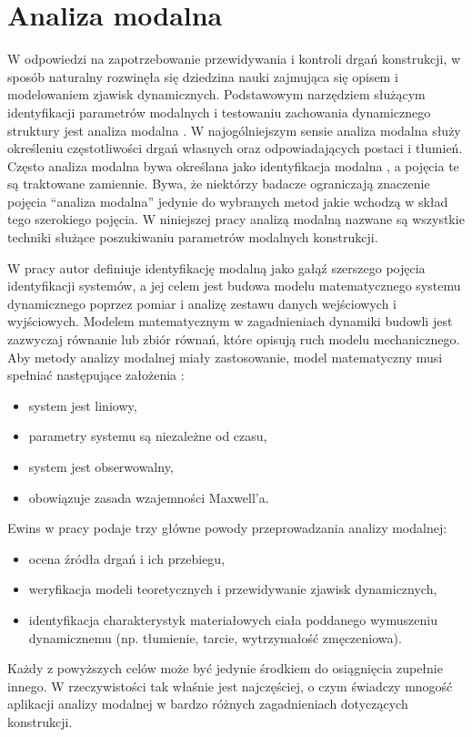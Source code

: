 \section{Analiza modalna} \label{section: modalAnalysisIntro}
W odpowiedzi na zapotrzebowanie przewidywania i kontroli drgań konstrukcji, w sposób naturalny rozwinęła się dziedzina nauki zajmująca się opisem i modelowaniem zjawisk dynamicznych. Podstawowym narzędziem służącym identyfikacji parametrów modalnych i testowaniu zachowania dynamicznego struktury jest analiza modalna . W najogólniejszym sensie analiza modalna służy określeniu częstotliwości drgań własnych oraz odpowiadających postaci i tłumień. Często analiza modalna bywa określana jako identyfikacja modalna , a pojęcia te są traktowane zamiennie. Bywa, że niektórzy badacze ograniczają znaczenie pojęcia \enquote{analiza modalna} jedynie do wybranych metod jakie wchodzą w skład tego szerokiego pojęcia. W niniejszej pracy analizą modalną nazwane są wszystkie techniki służące poszukiwaniu parametrów modalnych konstrukcji.

W pracy \parencite{Zhang2004} autor definiuje identyfikację modalną jako gałąź szerszego pojęcia identyfikacji systemów, a jej celem jest budowa modelu matematycznego systemu dynamicznego poprzez pomiar i analizę zestawu danych wejściowych i wyjściowych. Modelem matematycznym w zagadnieniach dynamiki budowli jest zazwyczaj równanie lub zbiór równań, które opisują ruch modelu mechanicznego. Aby metody analizy modalnej miały zastosowanie, model matematyczny musi spełniać następujące założenia \parencite{Maia1997}:
\begin{itemize}
	\item system jest liniowy,
	\item parametry systemu są niezależne od czasu,
	\item system jest obserwowalny,
	\item obowiązuje zasada wzajemności Maxwell'a.
\end{itemize}

Ewins w  pracy \cite{Ewins2000} podaje trzy główne powody przeprowadzania analizy modalnej:
\begin{itemize}
	\item ocena źródła drgań i ich przebiegu,
	\item weryfikacja modeli teoretycznych i przewidywanie zjawisk dynamicznych,
	\item identyfikacja charakterystyk materiałowych ciała poddanego wymuszeniu dynamicznemu (np. tłumienie, tarcie, wytrzymałość zmęczeniowa). 
\end{itemize}
Każdy z powyższych celów może być jedynie środkiem do osiągnięcia zupełnie innego. W rzeczywistości tak właśnie jest najczęściej, o czym świadczy mnogość aplikacji analizy modalnej w bardzo różnych zagadnieniach dotyczących konstrukcji. 


